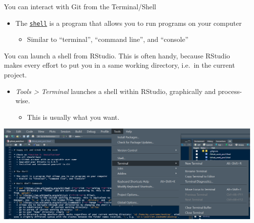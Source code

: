 \documentclass[
  ignorenonframetext,
]{beamer}
\providecommand{\tightlist}{%
  \setlength{\itemsep}{0pt}\setlength{\parskip}{0pt}}
\begin{document}
\begin{frame}[fragile]{You can interact with Git from the
Terminal/Shell}
\protect\hypertarget{you-can-interact-with-git-from-the-terminalshell}{}

\begin{itemize}
\tightlist
\item
  The \href{https://happygitwithr.com/shell.html}{\texttt{shell}} is a
  program that allows you to run programs on your computer

  \begin{itemize}
  \tightlist
  \item
    Similar to ``terminal'', ``command line'', and ``console''
  \end{itemize}
\end{itemize}

You can launch a shell from RStudio. This is often handy, because
RStudio makes every effort to put you in a same working directory,
i.e.~in the current project.

\begin{itemize}
\tightlist
\item
  \emph{Tools \textgreater{} Terminal} launches a shell within RStudio,
  graphically and process-wise.

  \begin{itemize}
  \tightlist
  \item
    This is usually what you want.
  \end{itemize}
\end{itemize}

\includegraphics{pres_figs/terminal.png}

\end{frame}
\end{document}
